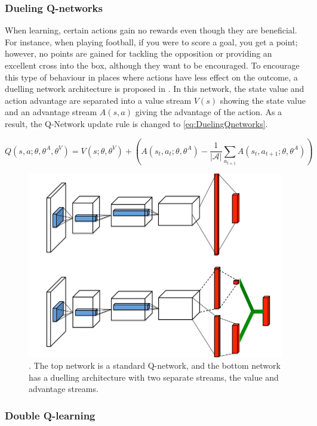 \subsubsection{Dueling Q-networks}
\label{sec:Dueling}

When learning, certain actions gain no rewards even though they are beneficial. For instance, when playing football, if you were to score a goal, you get a point; however, no points are gained for tackling the opposition or providing an excellent cross into the box, although they want to be encouraged. To encourage this type of behaviour in places where actions have less effect on the outcome, a duelling network architecture is proposed in \cite{wang2016dueling}. In this network, the state value and action advantage are separated into a value stream \(V(s)\) showing the state value and an advantage stream \(A(s,a)\) giving the advantage of the action. As a result, the Q-Network update rule is changed to \autoref{eq:DuelingQnetworks}.

\begin{equation}
    Q(s, a; \theta, \theta^{A}, \theta^{V}) = V(s; \theta, \theta^{V}) + \left( A(s_t, a_t; \theta, \theta^{A}) - \frac{1}{|\mathcal{A}|} \sum_{a_{t+1}} A(s_t, a_{t+1}; \theta, \theta^{A}) \right)
\label{eq:DuelingQnetworks}
\end{equation}

\begin{figure}
    \centering
    \includegraphics[width=0.5\linewidth]{figures/LiteratureStudy/RL_diagram_Dueling.png}
    \caption{\cite{wang2016dueling}. The top network is a standard Q-network, and the bottom network has a duelling architecture with two separate streams, the value and advantage streams.}
    \label{fig:enter-label}
\end{figure}

\subsubsection{Double Q-learning}
\label{sec:Double_Q_learning}

